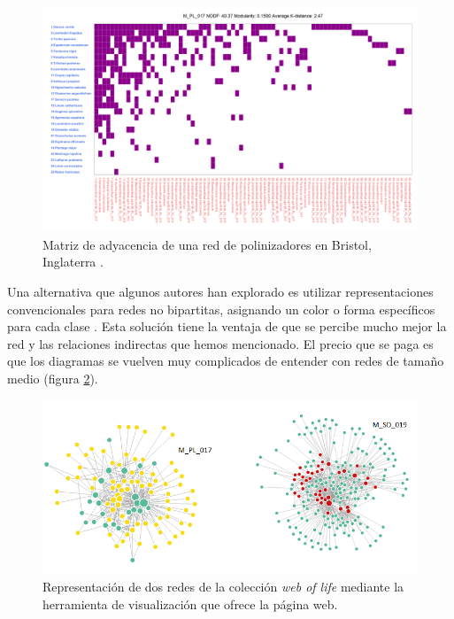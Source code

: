 \begin{figure}[hp!]
\centering
\includegraphics[scale=0.45]{Figures/VIS_M_PL_017_matrix.png}
\caption{Matriz de adyacencia de una red de polinizadores en Bristol, Inglaterra \cite{memmott1999structure}.}
\label{fig:VIS_matrix_PL_001}
\end{figure}

Una alternativa que algunos autores han explorado es utilizar representaciones convencionales para redes no bipartitas, asignando un color o forma específicos para cada clase \cite{mello2011missing,genini2010cheaters,toju2014assembly}. Esta solución tiene la ventaja de que se percibe mucho mejor la red y las relaciones indirectas que hemos mencionado. El precio que se paga es que los diagramas se vuelven muy complicados de entender con redes de tamaño medio (figura \ref{fig:VIS_grafos_weboflife}).

\begin{figure}[hp!]
\centering
\includegraphics[scale=0.75]{Figures/VIS_grafos_weboflife.png}
\caption{Representación de dos redes de la colección \textit{web of  life} mediante la herramienta de visualización que ofrece la página web.}
\label{fig:VIS_grafos_weboflife}
\end{figure}

